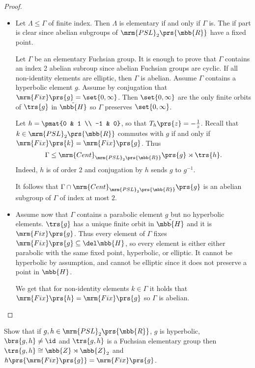 \documentclass[10pt, twoside]{book}
\begin{document}
\begin{proof}
\begin{itemize}
\item
Let $\Lambda \leq \Gamma$ of finite index. Then $\Lambda$ is elementary if and only if $\Gamma$ is. The if part is clear since abelian subgroups of $\mrm{PSL}_2\prs{\mbb{R}}$ have a fixed point.

Let $\Gamma$ be an elementary Fuchsian group. It is enough to prove that $\Gamma$ contains an index 2 abelian subroup since abelian Fuchsian groups are cyclic.
If all non-identity elements are elliptic, then $\Gamma$ is abelian. Assume $\Gamma$ contains a hyperbolic element $g$. Assume by conjugation that $\mrm{Fix}\prs{g} = \set{0,\infty}$. Then $\set{0,\infty}$ are the only finite orbits of $\trs{g}$ in $\tilde{\mbb{H}}$ so $\Gamma$ preserves $\set{0,\infty}$.

Let $h = \pmat{0 & 1 \\ -1 & 0}$, so that $T_h\prs{z} = -\frac{1}{z}$. Recall that $k \in \mrm{PSL}_2\prs{\mbb{R}}$ commutes with $g$ if and only if $\mrm{Fix}\prs{k} = \mrm{Fix}\prs{g}$.
Thus \[\Gamma \leq \mrm{Cent}_{\mrm{PSL}_2\prs{\mbb{R}}}\prs{g} \rtimes \trs{h} \text{.}\]
Indeed, $h$ is of order $2$ and conjugation by $h$ sends $g$ to $g^{-1}$.

It follows that $\Gamma \cap \mrm{Cent}_{\mrm{PSL}_2\prs{\mbb{R}}}\prs{g}$ is an abelian subgroup of $\Gamma$ of index at most $2$.

\item
Assume now that $\Gamma$ contains a parabolic element $g$ but no hyperbolic elements. $\trs{g}$ has a unique finite orbit in $\tilde{\mbb{H}}$ and it is $\mrm{Fix}\prs{g}$. Thus every element of $\Gamma$ fixes $\mrm{Fix}\prs{g} \subseteq \del \mbb{H}$, so every element is either either parabolic with the same fixed point, hyperbolic, or elliptic. It cannot be hyperbolic by assumption, and cannot be elliptic since it does not preserve a point in $\mbb{H}$.

We get that for non-identity elements $k \in \Gamma$ it holds that $\mrm{Fix}\prs{h} = \mrm{Fix}\prs{g}$ so $\Gamma$ is abelian.
\end{itemize}
\end{proof}

\begin{exercise}
Show that if $g,h \in \mrm{PSL}_2\prs{\mbb{R}}$, $g$ is hyperbolic, $\brs{g,h} \neq \id$ and $\trs{g,h}$ is a Fuchsian elementary group then $\trs{g,h} \cong \mbb{Z} \rtimes \mbb{Z}_2$ and $h\prs{\mrm{Fix}\prs{g}} = \mrm{Fix}\prs{g}$.
\end{exercise}
\end{document}
